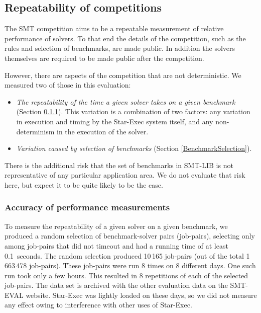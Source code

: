 \documentclass{eptcs}
\begin{document}
\subsection{Repeatability of competitions}
\label{CompetitionRepeatability}

The SMT competition aims to be a repeatable measurement of relative performance of solvers. To that end the details of the competition, such as the rules and selection of benchmarks, are made public. In addition the solvers themselves are required to be made public after the competition.

However, there are aspects of the competition that are not deterministic. We measured two of those in this evaluation:
\begin{itemize}[noitemsep,nolistsep]
\item {\em The repeatability of the time a given solver takes on a given benchmark} (Section \ref{Accuracy}). This variation is a combination of two factors: any variation in execution and timing by the Star-Exec system itself, and any non-determinism in the execution of the solver.
\item {\em Variation caused by selection of benchmarks} (Section \ref{BenchmarkSelection}). \end{itemize}
 
 There is the additional risk that the set of benchmarks in SMT-LIB is not representative of any particular application area. We do not evaluate that risk here, but expect it to be quite likely to be the case.
 
\subsubsection{Accuracy of performance measurements}
\label{Accuracy}

To measure the repeatability of a given solver on a given benchmark, we produced a random selection of benchmark-solver pairs (job-pairs), selecting only among job-pairs that did not timeout and had a running time of at least 0.1~seconds. The random selection produced 10\,165 job-pairs (out of the total 1\,663\,478 job-pairs). These job-pairs were run 8 times on 8 different days. One such run took only a few hours. This resulted in 8 repetitions of each of the selected job-pairs. The data set is archived with the other evaluation data on the SMT-EVAL website. Star-Exec was lightly loaded on these days, so we did not measure any effect owing to interference with other uses of Star-Exec.
\end{document}
